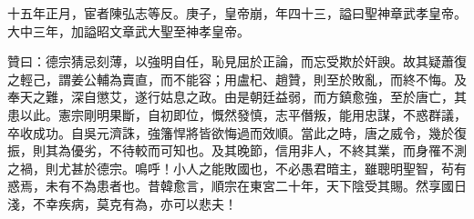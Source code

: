 \begin{pinyinscope}
 十五年正月，宦者陳弘志等反。庚子，皇帝崩，年四十三，謚曰聖神章武孝皇帝。大中三年，加謚昭文章武大聖至神孝皇帝。



 贊曰：德宗猜忌刻薄，以強明自任，恥見屈於正論，而忘受欺於奸諛。故其疑蕭復之輕己，謂姜公輔為賣直，而不能容；用盧杞、趙贊，則至於敗亂，而終不悔。及奉天之難，深自懲艾，遂行姑息之政。由是朝廷益弱，而方鎮愈強，至於唐亡，其患以此。憲宗剛明果斷，自初即位，慨然發慎，志平僭叛，能用忠謀，不惑群議，卒收成功。自吳元濟誅，強籓悍將皆欲悔過而效順。當此之時，唐之威令，幾於復振，則其為優劣，不待較而可知也。及其晚節，信用非人，不終其業，而身罹不測之禍，則尤甚於德宗。鳴呼！小人之能敗國也，不必愚君暗主，雖聰明聖智，茍有惑焉，未有不為患者也。昔韓愈言，順宗在東宮二十年，天下陰受其賜。然享國日淺，不幸疾病，莫克有為，亦可以悲夫！



\end{pinyinscope}